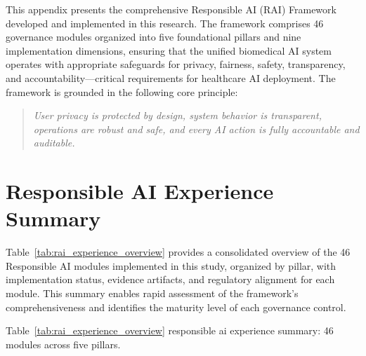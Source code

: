 
\label{app:responsible_ai}

This appendix presents the comprehensive Responsible AI (RAI) Framework developed and implemented in this research. The framework comprises 46 governance modules organized into five foundational pillars and nine implementation dimensions, ensuring that the unified biomedical AI system operates with appropriate safeguards for privacy, fairness, safety, transparency, and accountability---critical requirements for healthcare AI deployment. The framework is grounded in the following core principle:

\begin{quote}
\textit{User privacy is protected by design, system behavior is transparent, operations are robust and safe, and every AI action is fully accountable and auditable.}
\end{quote}

\section{Responsible AI Experience Summary}
\label{sec:rai_experience_summary}

Table~\ref{tab:rai_experience_overview} provides a consolidated overview of the 46 Responsible AI modules implemented in this study, organized by pillar, with implementation status, evidence artifacts, and regulatory alignment for each module. This summary enables rapid assessment of the framework's comprehensiveness and identifies the maturity level of each governance control.

\tablefontsize

\noindent Table~\ref{tab:rai_experience_overview} responsible ai experience summary: 46 modules across five pillars.

